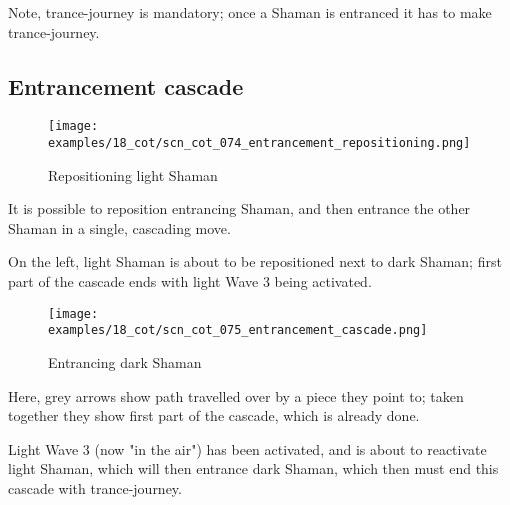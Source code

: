 Note, trance-journey is mandatory; once a Shaman is entranced it has to make
trance-journey.

\clearpage %

\subsection*{Entrancement cascade}
\label{sec:Conquest of Tlalocan/Trance-journey/Entrancement cascade}

\noindent
\begin{wrapfigure}[9]{l}{0.4\textwidth}
\centering
\texttt{[image: examples/18\_cot/scn\_cot\_074\_entrancement\_repositioning.png]}
\vspace*{-0.4\baselineskip}
\caption{Repositioning light Shaman}
\label{fig:scn_cot_074_entrancement_repositioning}
\end{wrapfigure}
It is possible to reposition entrancing Shaman, and then entrance the other Shaman
in a single, cascading move.

On the left, light Shaman is about to be repositioned next to dark Shaman; first
part of the cascade ends with light Wave 3 being activated.

\vspace*{5.3\baselineskip}

\noindent
\begin{wrapfigure}[11]{l}{0.4\textwidth}
\centering
\texttt{[image: examples/18\_cot/scn\_cot\_075\_entrancement\_cascade.png]}
\vspace*{-0.4\baselineskip}
\caption{Entrancing dark Shaman}
\label{fig:scn_cot_075_entrancement_cascade}
\end{wrapfigure}
Here, grey arrows show path travelled over by a piece they point to; taken together
they show first part of the cascade, which is already done.

Light Wave 3 (now "in the air") has been activated, and is about to reactivate
light Shaman, which will then entrance dark Shaman, which then must end this
cascade with trance-journey.

\clearpage %


